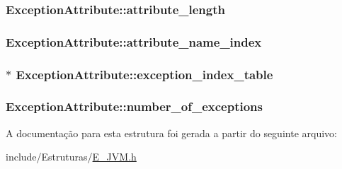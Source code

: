 \subsubsection[{attribute\+\_\+length}]{ Exception\+Attribute\+::attribute\+\_\+length}\label{struct_exception_attribute_ab07437f9c5ab9682f41d7a36e146ed8a}
\hypertarget{struct_exception_attribute_a0d10afce4ebfc218924ec98121e2a37f}{}
\subsubsection[{attribute\+\_\+name\+\_\+index}]{ Exception\+Attribute\+::attribute\+\_\+name\+\_\+index}\label{struct_exception_attribute_a0d10afce4ebfc218924ec98121e2a37f}
\hypertarget{struct_exception_attribute_aa1607cc18ce94ce03891d766a380d041}{}
\subsubsection[{exception\+\_\+index\+\_\+table}]{$\ast$ Exception\+Attribute\+::exception\+\_\+index\+\_\+table}\label{struct_exception_attribute_aa1607cc18ce94ce03891d766a380d041}
\hypertarget{struct_exception_attribute_a389b17447aa3278771d0649f1df66e69}{}
\subsubsection[{number\+\_\+of\+\_\+exceptions}]{ Exception\+Attribute\+::number\+\_\+of\+\_\+exceptions}\label{struct_exception_attribute_a389b17447aa3278771d0649f1df66e69}


A documentação para esta estrutura foi gerada a partir do seguinte arquivo\+:\begin{DoxyCompactItemize}
\item 
include/\+Estruturas/\hyperlink{_e___j_v_m_8h}{E\+\_\+\+J\+V\+M.\+h}\end{DoxyCompactItemize}
